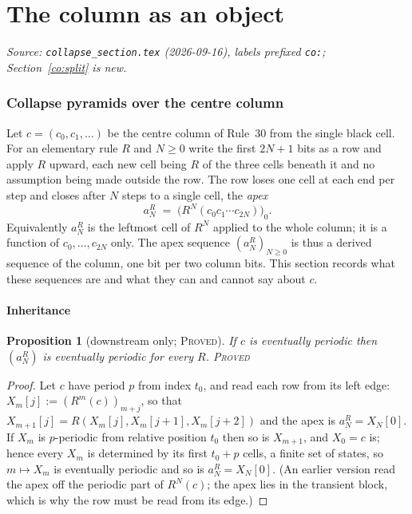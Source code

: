 \documentclass[11pt]{article}
\newtheorem{proposition}[theorem]{Proposition}
\theoremstyle{definition}
\theoremstyle{remark}
\newcommand{\PROVED}{\textsc{Proved}}
\begin{document}
\part{The column as an object}

\noindent\emph{Source: \texttt{collapse\_section.tex} (2026-09-16), labels prefixed \texttt{co:}; Section~\ref{co:split} is new.}

\section{Collapse pyramids over the centre column}

Let $c=(c_0,c_1,\dots)$ be the centre column of Rule~30 from the single black cell. For an elementary
rule $R$ and $N\ge 0$ write the first $2N+1$ bits as a row and apply $R$ upward, each new cell being
$R$ of the three cells beneath it and no assumption being made outside the row. The row loses one cell
at each end per step and closes after $N$ steps to a single cell, the \emph{apex}
\[
  a^R_N \;=\; \bigl(R^N(c_0c_1\cdots c_{2N})\bigr)_0 .
\]
Equivalently $a^R_N$ is the leftmost cell of $R^N$ applied to the whole column; it is a function of
$c_0,\dots,c_{2N}$ only. The apex sequence $(a^R_N)_{N\ge 0}$ is thus a derived sequence of the column,
one bit per two column bits. This section records what these sequences are and what they can and cannot
say about $c$.

\subsection{Inheritance}

\begin{proposition}[downstream only; \PROVED]\label{co:prop:inherit}
If $c$ is eventually periodic then $(a^R_N)$ is eventually periodic for every $R$. \PROVED
\end{proposition}
\begin{proof}
Let $c$ have period $p$ from index $t_0$, and read each row from its left edge: $X_m[j]:=(R^m(c))_{m+j}$, so that
$X_{m+1}[j]=R(X_m[j],X_m[j+1],X_m[j+2])$ and the apex is $a^R_N=X_N[0]$. If $X_m$ is $p$-periodic from relative position
$t_0$ then so is $X_{m+1}$, and $X_0=c$ is; hence every $X_m$ is determined by its first $t_0+p$ cells, a finite set of
states, so $m\mapsto X_m$ is eventually periodic and so is $a^R_N=X_N[0]$. (An earlier version read the apex off the
periodic part of $R^N(c)$; the apex lies in the transient block, which is why the row must be read from its edge.)
\end{proof}
\end{document}
